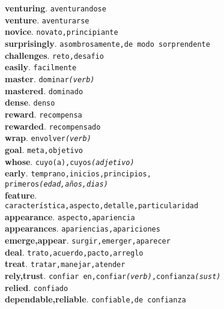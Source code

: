 \documentclass[twocolumn]{article}
\begin{document}
	\textsf{\textbf{venturing}}. \texttt{aventurandose}\\
	\textsf{\textbf{venture}}. \texttt{aventurarse}\\
	\textsf{\textbf{novice}}. \texttt{novato,principiante}\\
	\textsf{\textbf{surprisingly}}. \texttt{asombrosamente,de modo sorprendente}\\
	\textsf{\textbf{challenges}}. \texttt{reto,desafio}\\
	\textsf{\textbf{easily}}. \texttt{facilmente}\\
	\textsf{\textbf{master}}. \texttt{dominar{\scriptsize \textsl{(verb)}}}\\
	\textsf{\textbf{mastered}}. \texttt{dominado}\\
	\textsf{\textbf{dense}}. \texttt{denso}\\
	\textsf{\textbf{reward}}. \texttt{recompensa}\\
	\textsf{\textbf{rewarded}}. \texttt{recompensado}\\
	\textsf{\textbf{wrap}}. \texttt{envolver{\scriptsize \textsl{(verb)}}}\\
	\textsf{\textbf{goal}}. \texttt{meta,objetivo}\\
	\textsf{\textbf{whose}}. \texttt{cuyo(a),cuyos{\scriptsize \textsl{(adjetivo)}}}\\
	\textsf{\textbf{early}}. \texttt{temprano,inicios,principios,\\primeros{\scriptsize \textsl{(edad,a\~nos,dias)}}}\\
	\textsf{\textbf{feature}}.\\\texttt{caracter\'istica,aspecto,detalle,particularidad}\\
	\textsf{\textbf{appearance}}. \texttt{aspecto,apariencia}\\
	\textsf{\textbf{appearances}}. \texttt{apariencias,apariciones}\\
	\textsf{\textbf{emerge,appear}}. \texttt{surgir,emerger,aparecer}\\
	\textsf{\textbf{deal}}. \texttt{trato,acuerdo,pacto,arreglo}\\
	\textsf{\textbf{treat}}. \texttt{tratar,manejar,atender}\\
	\textsf{\textbf{rely,trust}}. \texttt{confiar en,confiar{\scriptsize \textsl{(verb)}},confianza{\scriptsize \textsl{(sust)}}}\\
	\textsf{\textbf{relied}}. \texttt{confiado}\\
	\textsf{\textbf{dependable,reliable}}. \texttt{confiable,de confianza}\\
\end{document}

